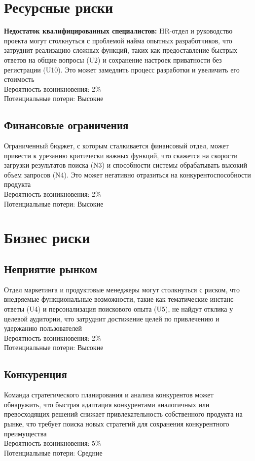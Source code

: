\documentclass[12pt,a4paper]{article}
\begin{document}
\section{Ресурсные риски}
\textbf{Недостаток квалифицированных специалистов:} HR-отдел и руководство проекта могут столкнуться с проблемой найма опытных разработчиков, что затруднит реализацию сложных функций, таких как предоставление быстрых ответов на общие вопросы (U2) и сохранение настроек приватности без регистрации (U10). Это может замедлить процесс разработки и увеличить его стоимость
\\ \hfill\break
Вероятность возникновения: 2\% \\
Потенциальные потери: Высокие

\subsection{Финансовые ограничения}
Ограниченный бюджет, с которым сталкивается финансовый отдел, может привести к урезанию критически важных функций, что скажется на скорости загрузки результатов поиска (N3) и способности системы обрабатывать высокий объем запросов (N4). Это может негативно отразиться на конкурентоспособности продукта
\\ \hfill\break
Вероятность возникновения: 2\% \\
Потенциальные потери: Высокие

\section{Бизнес риски}
\subsection{Неприятие рынком}
Отдел маркетинга и продуктовые менеджеры могут столкнуться с риском, что внедряемые функциональные возможности, такие как тематические инстанс-ответы (U4) и персонализация поискового опыта (U5), не найдут отклика у целевой аудитории, что затруднит достижение целей по привлечению и удержанию пользователей
\\ \hfill\break
Вероятность возникновения: 2\% \\
Потенциальные потери: Высокие

\subsection{Конкуренция}
Команда стратегического планирования и анализа конкурентов может обнаружить, что быстрая адаптация конкурентами аналогичных или превосходящих решений снижает привлекательность собственного продукта на рынке, что требует поиска новых стратегий для сохранения конкурентного преимущества
\\ \hfill\break
Вероятность возникновения: 5\% \\
Потенциальные потери: Средние
\end{document}
